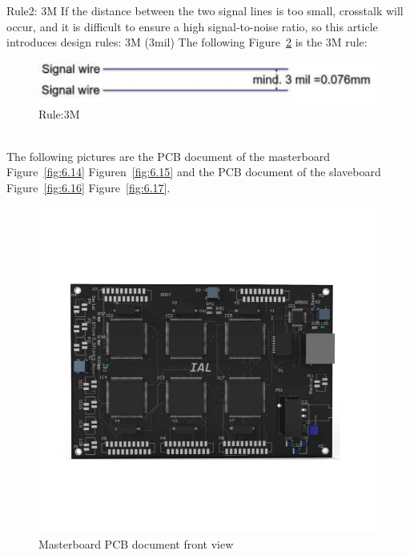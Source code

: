 Rule2: 3M
If the distance between the two signal lines is too small, crosstalk will occur, and it is difficult to ensure a high signal-to-noise ratio, so this article introduces design rules: 3M (3mil)
The following Figure~\ref{fig:6.13} is the 3M rule:

\begin{figure}[!ht]
	\centering
	\includegraphics[width=16cm]{grafiken/6.13.pdf}
	\caption{Rule:3M} 
	\label{fig:6.13}
\end{figure}
\FloatBarrier
\\


The following pictures are the PCB document of the masterboard Figure~\ref{fig:6.14} Figuren~\ref{fig:6.15} and the PCB document of the slaveboard Figure~\ref{fig:6.16} Figure~\ref{fig:6.17}.

\begin{figure}[!ht]
	\centering
	\includegraphics[width=16cm]{grafiken/6.14.pdf}
	\caption{Masterboard PCB document front view} 
	\label{fig:6.13}
\end{figure}
\FloatBarrier
\\


